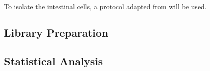 To isolate the intestinal cells, a protocol adapted from \cite{orourke_isolation_2016} will be used.


\subsection{Library Preparation}

\subsection{Statistical Analysis}

\clearpage

\printbibliography

